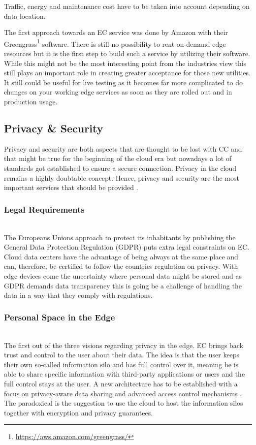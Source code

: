 Traffic, energy and maintenance cost have to be taken into account depending on data location.

The first approach towards an EC service was done by Amazon with their Greengrass\footnote{\url{https://aws.amazon.com/greengrass/}} software. There is still no possibility to rent on-demand edge resources but it is the first step to build such a service by utilizing their software. While this might not be the most interesting point from the industries view this still plays an important role in creating greater acceptance for those new utilities. It still could be useful for live testing as it becomes far more complicated to do changes on your working edge services as soon as they are rolled out and in production usage.

\subsection{Privacy \& Security}
Privacy and security are both aspects that are thought to be lost with CC and that might be true for the beginning of the cloud era but nowadays a lot of standards got established to ensure a secure connection. Privacy in the cloud remains a highly doubtable concept. Hence, privacy and security are the most important services that should be provided \cite{GarciaLopez:2015:ECV:2831347.2831354}.

\subsubsection{Legal Requirements}\hspace*{\fill} \\
The Europeans Unions approach to protect its inhabitants by publishing the General Data Protection Regulation (GDPR) puts extra legal constraints on EC.
Cloud data centers have the advantage of being always at the same place and can, therefore, be certified to follow the countries regulation on privacy.
With edge devices come the uncertainty where personal data might be stored and as GDPR \cite{eu01} demands data transparency this is going be a challenge of handling the data in a way that they comply with regulations.

\subsubsection{Personal Space in the Edge}\hspace*{\fill} \\
The first out of the three visions regarding privacy in the edge.
EC brings back trust and control to the user about their data. The idea is that the user keeps their own so-called information silo and has full control over it, meaning he is able to share specific information with third-party applications or users and the full control stays at the user.
A new architecture has to be established with a focus on privacy-aware data sharing and advanced access control mechanisms \cite{GarciaLopez:2015:ECV:2831347.2831354}.
The paradoxical is the suggestion to use the cloud to host the information silos together with encryption and privacy guarantees.

